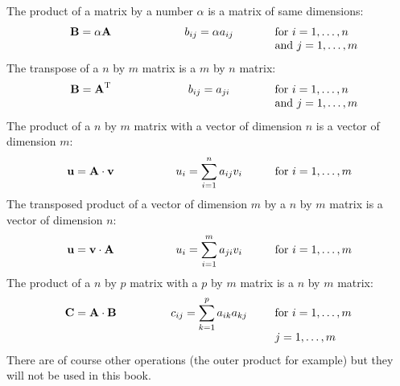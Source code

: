 The product of a matrix by a number $\alpha$ is a matrix of same
dimensions:
\begin{equation}
\begin{tabular}{ccc}
  \relboxc{0.27}{$\textbf{B}=\alpha\textbf{A}$}&\relboxc{0.27}{$b_{ij}=\alpha a_{ij}$}&\relboxl{0.27}{for $i=1,\ldots,n$}\\
  &&\relboxl{0.27}{and $j=1,\ldots,m$}\\
\end{tabular}
\end{equation}
The transpose of a $n$ by $m$ matrix is a $m$ by $n$ matrix:
\begin{equation}
\begin{tabular}{ccc}
  \relboxc{0.27}{$\textbf{B}=\textbf{A}^{\mathop{\textrm{T}}}$}&\relboxc{0.27}{$b_{ij}=a_{ji}$}&\relboxl{0.27}{for $i=1,\ldots,n$}\\
  &&\relboxl{0.27}{and $j=1,\ldots,m$}\\
\end{tabular}
\end{equation}
The product of a $n$ by $m$ matrix with a vector of dimension $n$
is a vector of dimension $m$:
\begin{equation}
\begin{tabular}{ccc}
  \relboxc{0.27}{$\textbf{u}=\textbf{A}\cdot\textbf{v}$}&\relboxc{0.27}{$u_i=\displaystyle\sum_{i=1}^n a_{ij}v_i$}&\relboxl{0.27}{for $i=1,\ldots,m$}\\
\end{tabular}
\end{equation}
The transposed product of a vector of dimension $m$ by a $n$ by
$m$ matrix is a vector of dimension $n$:
\begin{equation}
\begin{tabular}{ccc}
  \relboxc{0.27}{$\textbf{u}=\textbf{v}\cdot\textbf{A}$}&\relboxc{0.27}{$u_i=\displaystyle\sum_{i=1}^m a_{ji}v_i$}&\relboxl{0.27}{for $i=1,\ldots,m$}\\
\end{tabular}
\end{equation}
The product of a $n$ by $p$ matrix with a $p$ by $m$ matrix is a
$n$ by $m$ matrix:
\begin{equation}
\label{eq:matrixproduct}
\begin{tabular}{ccc}
  \relboxc{0.27}{$\textbf{C}=\textbf{A}\cdot\textbf{B}$}&\relboxc{0.27}{$c_{ij}=\displaystyle\sum_{k=1}^p a_{ik}a_{kj}$}&\relboxl{0.27}{for $i=1,\ldots,m$}\\
  &&\relboxl{0.27}{$j=1,\ldots,m$}\\
\end{tabular}
\end{equation}
There are of course other operations (the outer product for
example) but they will not be used in this book.

